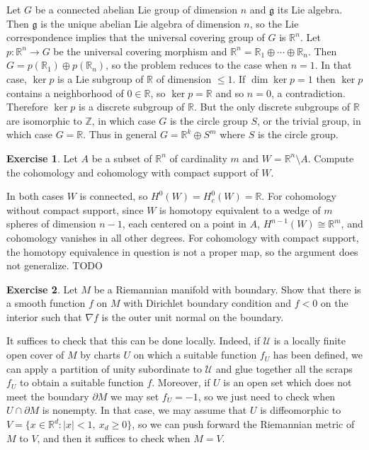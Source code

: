\documentclass[10pt]{article}
\newcommand{\ZZ}{\mathbb{Z}}
\newcommand{\RR}{\mathbb{R}}
\theoremstyle{definition}
\newtheorem{exer}{Exercise}
\begin{document}
Let $G$ be a connected abelian Lie group of dimension $n$ and $\mathfrak g$ its Lie algebra.
Then $\mathfrak g$ is the unique abelian Lie algebra of dimension $n$, so the Lie correspondence implies that the universal covering group of $G$ is $\RR^n$.
Let $p: \RR^n \to G$ be the universal covering morphism and $\RR^n = \RR_1 \oplus \cdots \oplus \RR_n$.
Then $G = p(\RR_1) \oplus p(\RR_n)$, so the problem reduces to the case when $n = 1$.
In that case, $\ker p$ is a Lie subgroup of $\RR$ of dimension $\leq 1$.
If $\dim \ker p = 1$ then $\ker p$ contains a neighborhood of $0 \in \RR$, so $\ker p = \RR$ and so $n = 0$, a contradiction.
Therefore $\ker p$ is a discrete subgroup of $\RR$.
But the only discrete subgroups of $\RR$ are isomorphic to $\ZZ$, in which case $G$ is the circle group $S$, or the trivial group, in which case $G = \RR$.
Thus in general $G = \RR^k \oplus S^m$ where $S$ is the circle group.

\begin{exer}
Let $A$ be a subset of $\RR^n$ of cardinality $m$ and $W = \RR^n \setminus A$. Compute the cohomology and cohomology with compact support of $W$.
\end{exer}

In both cases $W$ is connected, so $H^0(W) = H^0_c(W) = \RR$.
For cohomology without compact support, since $W$ is homotopy equivalent to a wedge of $m$ spheres of dimension $n - 1$, each centered on a point in $A$, $H^{n-1}(W) \cong \RR^m$, and cohomology vanishes in all other degrees.
For cohomology with compact support, the homotopy equivalence in question is not a proper map, so the argument does not generalize.
TODO

\begin{exer}
Let $M$ be a Riemannian manifold with boundary.
Show that there is a smooth function $f$ on $M$ with Dirichlet boundary condition and $f < 0$ on the interior such that $\nabla f$ is the outer unit normal on the boundary.
\end{exer}

It suffices to check that this can be done locally. Indeed, if $\mathcal U$ is a locally finite open cover of $M$ by charts $U$ on which a suitable function $f_U$ has been defined, we can apply a partition of unity subordinate to $\mathcal U$ and glue together all the scraps $f_U$ to obtain a suitable function $f$.
Moreover, if $U$ is an open set which does not meet the boundary $\partial M$ we may set $f_U = -1$, so we just need to check when $U \cap \partial M$ is nonempty. In that case, we may assume that $U$ is diffeomorphic to $V = \{x \in \RR^d: |x| < 1,~x_d \geq 0\}$, so we can push forward the Riemannian metric of $M$ to $V$, and then it suffices to check when $M = V$.
\end{document}
